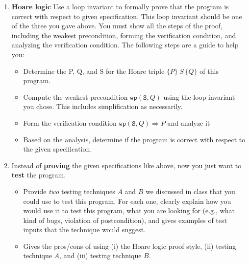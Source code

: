 \documentclass[10pt]{article}
\newcommand{\code}[1]{\texttt{#1}}
\begin{document}
\begin{enumerate}
  
\item \textbf{Hoare logic}  Use a loop invariant to formally prove that the program is correct with respect to given specification. This loop invariant should be one of the three you gave above. You must show all the steps of the proof, including the weakest precondition, forming the verification condition, and analyzing the verification condition. The following steps are a guide to help you: 
  \begin{itemize}
    \item Determine the P, Q, and S for the Hoare triple $\{P\} ~S~ \{Q\}$ of this program.
    \item Compute the weakest precondition $\code{wp}(\code{S}, Q)$ using the loop invariant you chose.  This includes simplification as necessarily.
    \item Form the verification condition $\code{wp}(\code{S}, Q) \Rightarrow P$ and analyze it
    \item Based on the analysis, determine if the program is correct with respect to the given specification.
  \end{itemize}
\item Instead of \textbf{proving} the given specifications like above, now you just want to \textbf{test} the program.
    \begin{itemize}
    \item Provide \emph{two} testing techniques $A$ and $B$ we discussed in class that you could use to test this program.  For each one, clearly explain how you would use it to test this program, what you are looking for (e.g., what kind of bugs, violation of postcondition), and gives examples of test inputs that the technique would suggest.
    \item Gives the pros/cons of using (i) the Hoare logic proof style, (ii) testing technique $A$, and (iii) testing technique $B$.
\end{itemize}
\end{enumerate}
\end{document}
